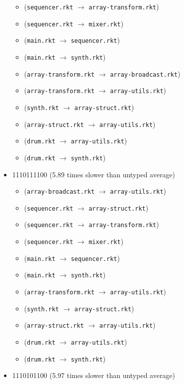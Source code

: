 \documentclass{article}
\newcommand{\mono}[1]{\texttt{#1}}
\begin{document}
\begin{itemize}
\begin{itemize}
  \item (\mono{sequencer.rkt} $\rightarrow$ \mono{array-transform.rkt})
  \item (\mono{sequencer.rkt} $\rightarrow$ \mono{mixer.rkt})
  \item (\mono{main.rkt} $\rightarrow$ \mono{sequencer.rkt})
  \item (\mono{main.rkt} $\rightarrow$ \mono{synth.rkt})
  \item (\mono{array-transform.rkt} $\rightarrow$ \mono{array-broadcast.rkt})
  \item (\mono{array-transform.rkt} $\rightarrow$ \mono{array-utils.rkt})
  \item (\mono{synth.rkt} $\rightarrow$ \mono{array-struct.rkt})
  \item (\mono{array-struct.rkt} $\rightarrow$ \mono{array-utils.rkt})
  \item (\mono{drum.rkt} $\rightarrow$ \mono{array-utils.rkt})
  \item (\mono{drum.rkt} $\rightarrow$ \mono{synth.rkt})
  \end{itemize}
\item 1110111100 (5.89 times slower than untyped average)
  \begin{itemize}
  \item (\mono{array-broadcast.rkt} $\rightarrow$ \mono{array-utils.rkt})
  \item (\mono{sequencer.rkt} $\rightarrow$ \mono{array-struct.rkt})
  \item (\mono{sequencer.rkt} $\rightarrow$ \mono{array-transform.rkt})
  \item (\mono{sequencer.rkt} $\rightarrow$ \mono{mixer.rkt})
  \item (\mono{main.rkt} $\rightarrow$ \mono{sequencer.rkt})
  \item (\mono{main.rkt} $\rightarrow$ \mono{synth.rkt})
  \item (\mono{array-transform.rkt} $\rightarrow$ \mono{array-utils.rkt})
  \item (\mono{synth.rkt} $\rightarrow$ \mono{array-struct.rkt})
  \item (\mono{array-struct.rkt} $\rightarrow$ \mono{array-utils.rkt})
  \item (\mono{drum.rkt} $\rightarrow$ \mono{array-utils.rkt})
  \item (\mono{drum.rkt} $\rightarrow$ \mono{synth.rkt})
  \end{itemize}
\item 1110101100 (5.97 times slower than untyped average)
  \begin{itemize}

\end{itemize}
\end{itemize}
\end{document}
